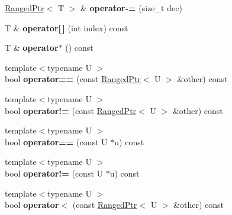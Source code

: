 \begin{DoxyCompactItemize}
\item 
\hypertarget{classmozilla_1_1_ranged_ptr_a1b233d7b734d5a18543789d0ac7f6550}{\hyperlink{classmozilla_1_1_ranged_ptr}{Ranged\-Ptr}$<$ T $>$ \& {\bfseries operator-\/=} (size\-\_\-t dec)}\label{classmozilla_1_1_ranged_ptr_a1b233d7b734d5a18543789d0ac7f6550}

\item 
\hypertarget{classmozilla_1_1_ranged_ptr_add1c9d7eceb7c06b32e0abcee1dc12a2}{T \& {\bfseries operator\mbox{[}$\,$\mbox{]}} (int index) const }\label{classmozilla_1_1_ranged_ptr_add1c9d7eceb7c06b32e0abcee1dc12a2}

\item 
\hypertarget{classmozilla_1_1_ranged_ptr_a484d6a1805b0d5d4b14c8eb11ab5b8fb}{T \& {\bfseries operator$\ast$} () const }\label{classmozilla_1_1_ranged_ptr_a484d6a1805b0d5d4b14c8eb11ab5b8fb}

\item 
\hypertarget{classmozilla_1_1_ranged_ptr_ab87971f26ae1f40178ab279a01532fce}{{\footnotesize template$<$typename U $>$ }\\bool {\bfseries operator==} (const \hyperlink{classmozilla_1_1_ranged_ptr}{Ranged\-Ptr}$<$ U $>$ \&other) const }\label{classmozilla_1_1_ranged_ptr_ab87971f26ae1f40178ab279a01532fce}

\item 
\hypertarget{classmozilla_1_1_ranged_ptr_a3ff2157a3bd687685ff3b3b35ef351ce}{{\footnotesize template$<$typename U $>$ }\\bool {\bfseries operator!=} (const \hyperlink{classmozilla_1_1_ranged_ptr}{Ranged\-Ptr}$<$ U $>$ \&other) const }\label{classmozilla_1_1_ranged_ptr_a3ff2157a3bd687685ff3b3b35ef351ce}

\item 
\hypertarget{classmozilla_1_1_ranged_ptr_acf7dfe86db84feedce60c614cdd3b871}{{\footnotesize template$<$typename U $>$ }\\bool {\bfseries operator==} (const U $\ast$u) const }\label{classmozilla_1_1_ranged_ptr_acf7dfe86db84feedce60c614cdd3b871}

\item 
\hypertarget{classmozilla_1_1_ranged_ptr_a537dd06b5fa857d0d8d5c722ec7531fd}{{\footnotesize template$<$typename U $>$ }\\bool {\bfseries operator!=} (const U $\ast$u) const }\label{classmozilla_1_1_ranged_ptr_a537dd06b5fa857d0d8d5c722ec7531fd}

\item 
\hypertarget{classmozilla_1_1_ranged_ptr_a860de8b9a9db1a90fc6f0a5907dbcf3a}{{\footnotesize template$<$typename U $>$ }\\bool {\bfseries operator$<$} (const \hyperlink{classmozilla_1_1_ranged_ptr}{Ranged\-Ptr}$<$ U $>$ \&other) const }\label{classmozilla_1_1_ranged_ptr_a860de8b9a9db1a90fc6f0a5907dbcf3a}


\end{DoxyCompactItemize}
